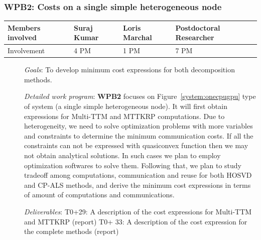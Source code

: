 \documentclass[a4paper,11pt]{article}
\newcommand{\goal}{{\color{orange2}  \emph{Goals}:} }
\newcommand{\dwp}{{\color{orange2}  \emph{Detailed work program}: }}
\newcommand{\deliverables}{{\color{orange2}  \emph{Deliverables}: }}
\begin{document}
	\subsubsection{\textbf{WPB2}: Costs on a single simple heterogeneous node}
	\begin{table}[H]
		\begin{tabular}{llll}
			\hline
			\cellcolor{blue2}
			Members involved & Suraj Kumar& Loris Marchal & Postdoctoral Researcher \\
			\hline
			\cellcolor{orange2}
			Involvement      & 4 PM            & 1 PM & 7 PM \\
			\hline
		\end{tabular}
	\end{table}
	\begin{description}
		\item[] \goal To develop minimum cost expressions for both decomposition methods. 
		\item[] \dwp \textbf{WPB2} focuses on Figure~\ref{system:onecpugpu} type of system (a single simple heterogeneous node). It will first obtain expressions for Multi-TTM and MTTKRP computations. Due to heterogeneity, we need to solve optimization problems with more variables and constraints to determine the minimum communication costs. If all the constraints can not be expressed with quasiconvex function then we may not obtain analytical solutions. In such cases we plan to employ optimization softwares to solve them.
		Following that, we plan to study tradeoff among computations, communication and reuse for both HOSVD and CP-ALS methods, and derive the minimum cost expressions in terms of amount of computations and communications. 
		\item[] \deliverables\newline
		T0+29: A description of the cost expressions for Multi-TTM and MTTKRP (report)\newline
		T0+ 33: A description of the cost expression for the complete methods (report)
	\end{description}
	
\end{document}
